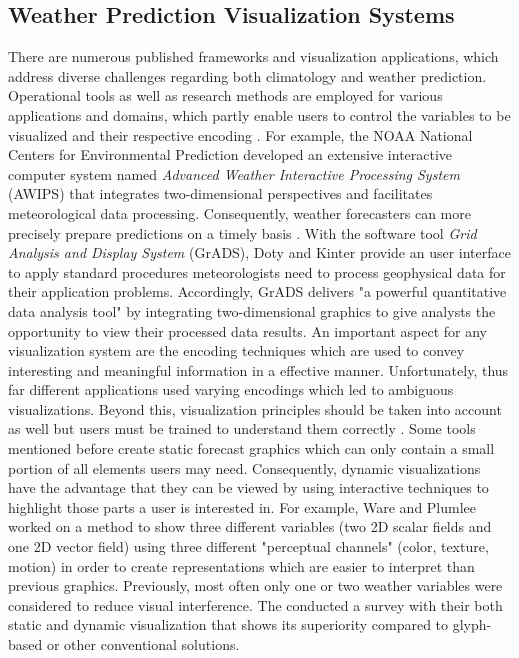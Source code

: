 \documentclass[citeauthoryear]{llncs}
\begin{document}
\subsection{Weather Prediction Visualization Systems}
There are numerous published frameworks and visualization applications, which address diverse challenges regarding both climatology and weather prediction. Operational tools as well as research methods are employed for various applications and domains, which partly enable users to control the variables to be visualized and their respective encoding \cite{gmt,metview}. For example, the NOAA National Centers for Environmental Prediction developed an extensive interactive computer system named \textit{Advanced Weather Interactive Processing System} (AWIPS) that integrates two-dimensional perspectives and facilitates meteorological data processing. Consequently, weather forecasters can more precisely prepare predictions on a timely basis \cite{awips}.  
With the software tool \textit{Grid Analysis and Display System} (GrADS), Doty and Kinter provide an user interface to apply standard procedures meteorologists need to process geophysical data for their application problems. Accordingly, GrADS delivers "a powerful quantitative data analysis tool"\cite{grads} by integrating two-dimensional graphics to give analysts the opportunity to view their processed data results. An important aspect for any visualization system are the encoding techniques which are used to convey interesting and meaningful information in a effective manner. Unfortunately, thus far different applications used varying encodings which led to ambiguous visualizations. Beyond this, visualization principles should be taken into account as well but users must be trained to understand them correctly \cite{quinan2016visually}. Some tools mentioned before create static forecast graphics which can only contain a small portion of all elements users may need. Consequently, dynamic visualizations have the advantage that they can be viewed by using interactive techniques to highlight those parts a user is interested in. For example, Ware and Plumlee \cite{ware2013designing} worked on a method to show three different variables (two 2D scalar fields and one 2D vector field) using three different "perceptual channels" (color, texture, motion) in order to create representations which are easier to interpret than previous graphics. Previously, most often only one or two weather variables were considered to reduce visual interference. The conducted a survey with their both static and dynamic visualization that shows its superiority compared to glyph-based or other conventional solutions.
\end{document}
